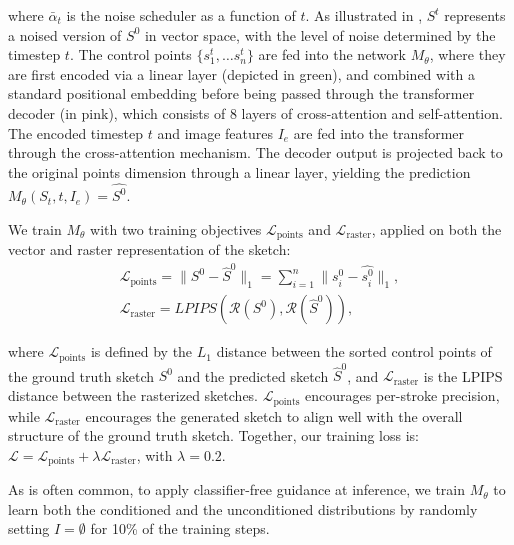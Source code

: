where $\bar{\alpha}_t$ is the noise scheduler as a function of $t$. As illustrated in , $S^t$ represents a noised version of $S^0$ in vector space, with the level of noise determined by the timestep $t$. 
The control points $\{s_1^t,\dots s_n^t\}$ are fed into the network $M_{\theta}$, where they are first encoded via a linear layer (depicted in green), and combined with a standard positional embedding before being passed through the transformer decoder (in pink), which consists of 8 layers of cross-attention and self-attention. The encoded timestep $t$ and image features $I_e$ are fed into the transformer through the cross-attention mechanism.
The decoder output is projected back to the original points dimension through a linear layer, yielding the prediction $M_{\theta}(S_t,t,I_e) = \hat{S^0}$. 

We train $M_{\theta}$ with two training objectives $\mathcal{L}_{\text{points}}$ and $\mathcal{L}_{\text{raster}}$, applied on both the vector and raster representation of the sketch:
\vspace{-0.1cm}
\begin{equation}
\label{eq:1}
\begin{aligned}
\mathcal{L}_{\text{points}} = \| S^0 - \hat{S}^0 \|_1 = \sum_{i=1}^{n} \| s_i^0-\hat{s_i^0}\|_1,  \\ 
\mathcal{L}_{\text{raster}} = LPIPS \left( \mathcal{R}(S^0), \mathcal{R}(\hat{S}^0)\right), 
\end{aligned}
\end{equation}

where $\mathcal{L}_{\text{points}}$ is defined by the $L_1$ distance between the sorted control points of the ground truth sketch $S^0$ and the predicted sketch $\hat{S}^0$, and $\mathcal{L}_{\text{raster}}$ is the LPIPS distance \cite{zhang2018perceptual} between the rasterized sketches.
$\mathcal{L}_{\text{points}}$ encourages per-stroke precision, while $\mathcal{L}_{\text{raster}}$ encourages the generated sketch to align well with the overall structure of the ground truth sketch. 
Together, our training loss is: $\mathcal{L} = \mathcal{L}_{\text{points}} + \lambda \mathcal{L}_{\text{raster}}$, with $\lambda=0.2$.

As is often common, to apply classifier-free guidance \cite{Ho2022ClassifierFreeDG} at inference, we train $M_{\theta}$ to learn both the conditioned and the unconditioned distributions by randomly setting \( I = \emptyset \) for 10\% of the training steps.




